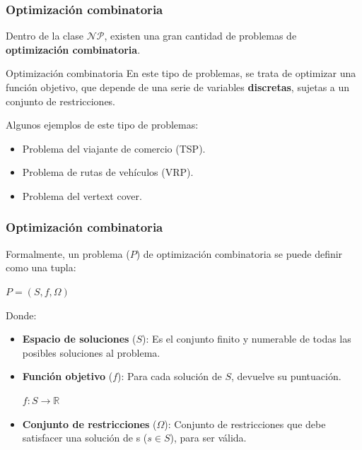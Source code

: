 \documentclass{beamer}
\begin{document}
\begin{frame}
\frametitle{Optimización combinatoria}

Dentro de la clase $\mathcal{NP}$, existen una gran cantidad de problemas de \textbf{optimización combinatoria}.

\bigskip

\begin{block}{Optimización combinatoria}
 En este tipo de problemas, se trata de optimizar una función objetivo, que depende de una serie de variables \textbf{discretas}, sujetas a un conjunto de restricciones.
\end{block}

\bigskip

Algunos ejemplos de este tipo de problemas:

\begin{itemize}
    \item Problema del viajante de comercio (TSP).
    \item Problema de rutas de vehículos (VRP).
    \item Problema del vertext cover.
\end{itemize}
\end{frame}

\begin{frame}
\frametitle{Optimización combinatoria}

Formalmente, un problema ($P$) de optimización combinatoria se puede definir como una tupla:

\begin{center}
    $P = (S, f, \Omega)$
\end{center}

Donde:

\begin{itemize}
    \item \textbf{Espacio de soluciones} ($S$): Es el conjunto finito y numerable de todas las posibles soluciones al problema.
    \item \textbf{Función objetivo} ($f$): Para cada solución de $S$, devuelve su puntuación.
    \begin{center}
        \begin{math}
            f: S \rightarrow \mathbb{R}
        \end{math}
    \end{center}
    \item \textbf{Conjunto de restricciones} ($\Omega$): Conjunto de restricciones que debe satisfacer una solución de s ($s \in S$), para ser válida.
\end{itemize}

\end{frame}
\end{document}
